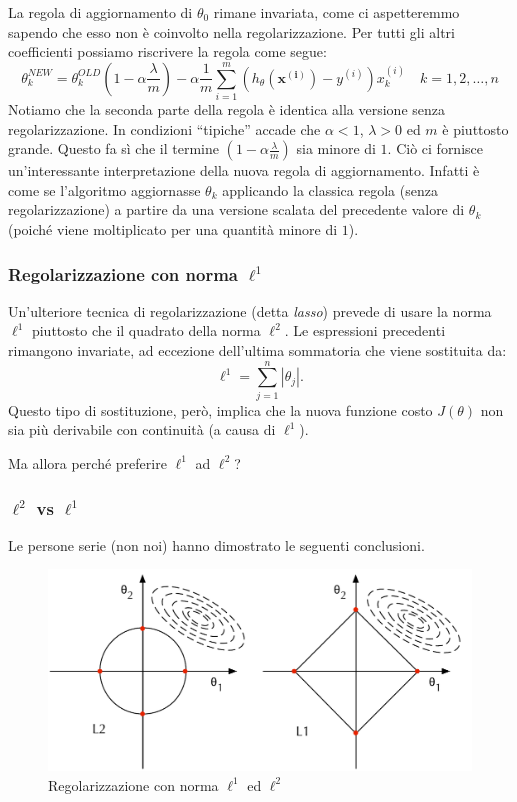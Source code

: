 La regola di aggiornamento di $\theta_0$ rimane invariata, come ci aspetteremmo sapendo che esso non è coinvolto nella regolarizzazione. Per tutti gli altri coefficienti possiamo riscrivere la regola come segue:
\begin{equation*}
\displaystyle\theta^{NEW}_k = \theta^{OLD}_k \left(1- \alpha\frac{\lambda}{m}\right) - \alpha \frac{1}{m} \sum_{i=1}^m \left(h_\theta(\mathbf{x^{(i)}}) - y^{(i)}\right)x_k^{(i)} \quad k=1,2,\dots,n
\end{equation*}
Notiamo che la seconda parte della regola è identica alla versione senza regolarizzazione. In condizioni ``tipiche'' accade che $\alpha<1$, $\lambda > 0$ ed $m$ è piuttosto grande. Questo fa sì che il termine $\left(1- \alpha\frac{\lambda}{m}\right)$ sia minore di $1$. Ciò ci fornisce un'interessante interpretazione della nuova regola di aggiornamento. Infatti è come se l'algoritmo aggiornasse $\theta_k$ applicando la classica regola (senza regolarizzazione) a partire da una versione scalata del precedente valore di $\theta_k$ (poiché viene moltiplicato per una quantità minore di $1$).

\subsubsection{Regolarizzazione con norma $\ell^1$}
Un'ulteriore tecnica di regolarizzazione (detta \emph{lasso}) prevede di usare la norma $\ell^1$ piuttosto che il quadrato della norma $\ell^2$. 
Le espressioni precedenti rimangono invariate, ad eccezione dell'ultima sommatoria che viene sostituita da:
\begin{equation*}
\ell^1 = \sum_{j=1}^n|\theta_j|.
\end{equation*}
Questo tipo di sostituzione, però, implica che la nuova funzione costo $J(\theta)$ non sia più derivabile con continuità (a causa di $\ell^1$). 

Ma allora perché preferire $\ell^1$ ad $\ell^2$?

\subsubsection{$\ell^2$ vs $\ell^1$}
Le persone serie (non noi) hanno dimostrato le seguenti conclusioni.

\begin{figure}[]
\centering
  \includegraphics[width=\columnwidth]{images/norme}
  \caption{Regolarizzazione con norma $\ell^1$ ed $\ell^2$}
  \label{fig:norme}
\end{figure}

